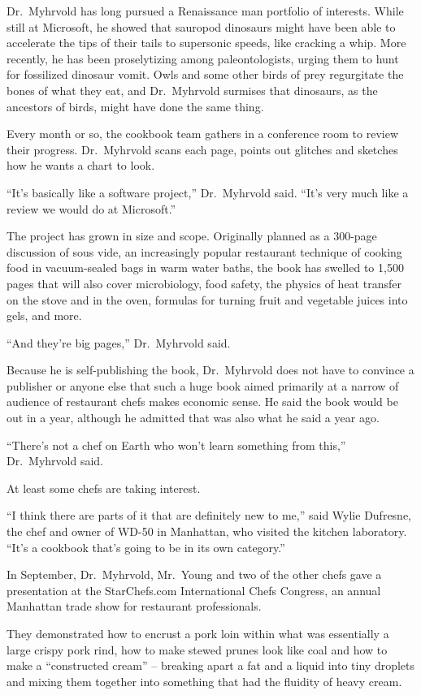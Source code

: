 ﻿\documentclass[12pt]{article}
\begin{document}
Dr.~Myhrvold has long pursued a Renaissance man portfolio of interests. While still at Microsoft, he
showed that sauropod dinosaurs might have been able to accelerate the tips of their tails to
supersonic speeds, like cracking a whip. More recently, he has been proselytizing among
paleontologists, urging them to hunt for fossilized dinosaur vomit. Owls and some other birds of
prey regurgitate the bones of what they eat, and Dr.~Myhrvold surmises that dinosaurs, as the
ancestors of birds, might have done the same thing.

Every month or so, the cookbook team gathers in a conference room to review their progress.
Dr.~Myhrvold scans each page, points out glitches and sketches how he wants a chart to look.

``It's basically like a software project,'' Dr.~Myhrvold said. ``It's very much like a review we
would do at Microsoft.''

The project has grown in size and scope. Originally planned as a 300-page discussion of sous vide,
an increasingly popular restaurant technique of cooking food in vacuum-sealed bags in warm water
baths, the book has swelled to 1,500 pages that will also cover microbiology, food safety, the
physics of heat transfer on the stove and in the oven, formulas for turning fruit and vegetable
juices into gels, and more.

``And they're big pages,'' Dr.~Myhrvold said.

Because he is self-publishing the book, Dr.~Myhrvold does not have to convince a publisher or anyone
else that such a huge book aimed primarily at a narrow of audience of restaurant chefs makes
economic sense. He said the book would be out in a year, although he admitted that was also what he
said a year ago.

``There's not a chef on Earth who won't learn something from this,'' Dr.~Myhrvold said.

At least some chefs are taking interest.

``I think there are parts of it that are definitely new to me,'' said Wylie Dufresne, the chef and
owner of WD-50 in Manhattan, who visited the kitchen laboratory. ``It's a cookbook that's going to
be in its own category.''

In September, Dr.~Myhrvold, Mr.~Young and two of the other chefs gave a presentation at the
StarChefs.com International Chefs Congress, an annual Manhattan trade show for restaurant
professionals.

They demonstrated how to encrust a pork loin within what was essentially a large crispy pork rind,
how to make stewed prunes look like coal and how to make a ``constructed cream'' -- breaking apart a
fat and a liquid into tiny droplets and mixing them together into something that had the fluidity of
heavy cream.
\end{document}
